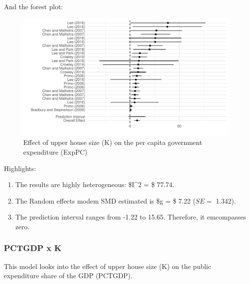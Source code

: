 \documentclass[
]{article}
\providecommand{\tightlist}{%
  \setlength{\itemsep}{0pt}\setlength{\parskip}{0pt}}
\begin{document}
And the forest plot:

\begin{figure}
\centering
\includegraphics{appendixV5_files/figure-latex/unnamed-chunk-43-1.pdf}
\caption{Effect of upper house size (K) on the per capita government
expenditure (ExpPC)}
\end{figure}

Highlights:

\begin{enumerate}
\def\labelenumi{\arabic{enumi}.}
\tightlist
\item
  The results are highly heterogeneous: \$I\^{}2 = \$ 77.74.
\item
  The Random effects modem SMD estimated is \$g = \$ 7.22 (\(SE =\)
  1.342).
\item
  The prediction interval ranges from -1.22 to 15.65. Therefore, it
  emcompasses zero.
\end{enumerate}

\newpage

\hypertarget{pctgdp-x-k-1}{%
\subsubsection{PCTGDP x K}\label{pctgdp-x-k-1}}

This model looks into the effect of upper house size (K) on the public
expenditure share of the GDP (PCTGDP).
\end{document}
